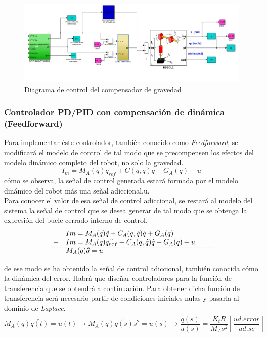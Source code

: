 \begin{figure}[h!]
	\centering
	\includegraphics[width=.8\textwidth]{montaje_grav}
	\caption{Diagrama de control del compensador de gravedad}
\end{figure}

	\subsubsection{Controlador PD/PID con compensación de dinámica (Feedforward)}
	Para implementar éste controlador, también conocido como \textit{Feedforward}, se modificará el modelo de control de tal modo que se precompensen los efectos del modelo dinámico completo del robot, no solo la gravedad.
	\begin{equation}
		I_m= M_{A}(q)\ddot{q_{ref}} + C(q,\dot{q})\dot{q} + G_{A}(q) + u
	\end{equation}
cómo se observa, la señal de control generada estará formada por el modelo dinámico del robot más una señal adiccional,u.\\
Para conocer el valor de esa señal de control adiccional, se restará al modelo del sistema la señal de control que se desea generar de tal modo que se obtenga la expresión del bucle cerrado interno de control.
\begin{equation}
	\begin{array}{llll}
	  & Im=M_{A}(q)\ddot{q} + C_{A}(q,\dot{q})\dot{q} + G_{A}(q) \\
	- & Im=M_{A}(q)\ddot{q_{ref}} + C_{A}(q,\dot{q})\dot{q} + G_{A}(q) + u \\
	\cline{1-4}
	\vspace{0.2cm}
	  & M_{A}(q)\tilde{\ddot{q}} = u & &
	\end{array}
\end{equation}
de ese modo se ha obtenido la señal de control adiccional, también conocida cómo la dinámica del error. Habrá que diseñar controladores para la función de transferencia que se obtendrá a continuación. Para obtener dicha función de transferencia será necesario partir de condiciones iniciales nulas y pasarla al dominio de \textit{Laplace}.
\begin{equation}
	M_{A}(q)\tilde{\ddot{q(t)}} = u(t) \rightarrow M_{A}(q)\tilde{q(s)}s^{2} = u(s) \rightarrow \frac{\tilde{q(s)}}{u(s)}=\frac{K_{t}R}{M_{A}s^{2}}[\frac{ud.error}{ud.sc}]
\end{equation}

